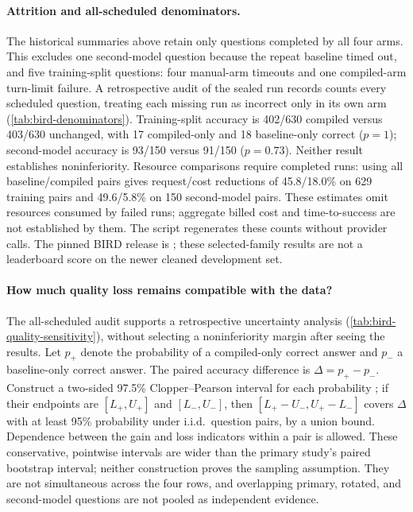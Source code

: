 \paragraph{Attrition and all-scheduled denominators.}
The historical summaries above retain only questions completed by all four
arms. This excludes one second-model question because the repeat baseline
 timed out, and five training-split questions: four manual-arm timeouts and
one compiled-arm turn-limit failure. A retrospective audit of the sealed run
records counts every scheduled question, treating each missing run as incorrect
only in its own arm (\cref{tab:bird-denominators}). Training-split accuracy is
402/630 compiled versus 403/630 unchanged, with 17 compiled-only and 18
baseline-only correct ($p=1$); second-model accuracy is 93/150 versus 91/150
($p=0.73$). Neither result establishes noninferiority. Resource comparisons
require completed runs: using all baseline/compiled pairs gives request/cost
reductions of 45.8/18.0\% on 629 training pairs and 49.6/5.8\% on 150
second-model pairs. These estimates omit resources consumed by failed runs;
aggregate billed cost and time-to-success are not established by them.
The script  regenerates these
counts without provider calls. The pinned BIRD release is
; these selected-family results are not a leaderboard score
on the newer cleaned development set.

\begin{table}[t]
  \centering
  \caption{Retrospective BIRD quality over all scheduled questions. Missing
  runs count as incorrect in their own arm; ``Complete'' is the historical
  four-arm intersection. Rotated repeats the primary questions.}
  \label{tab:bird-denominators}
  \footnotesize
  
\end{table}

\paragraph{How much quality loss remains compatible with the data?}
The all-scheduled audit supports a retrospective uncertainty analysis
(\cref{tab:bird-quality-sensitivity}), without selecting a noninferiority margin
after seeing the results. Let $p_+$ denote the probability of a compiled-only
correct answer and $p_-$ a baseline-only correct answer. The paired accuracy
difference is $\Delta=p_+-p_-$. Construct a two-sided 97.5\% Clopper--Pearson
interval for each probability \citep{clopper1934binomial}; if their endpoints are
$[L_+,U_+]$ and $[L_-,U_-]$, then $[L_+-U_-,U_+-L_-]$ covers $\Delta$ with
at least 95\% probability under i.i.d.\ question pairs, by a union bound.
Dependence between the gain and loss indicators within a pair is allowed.
These conservative, pointwise intervals are wider than the primary study's
paired bootstrap interval; neither construction proves the sampling assumption.
They are not simultaneous across the four rows, and overlapping primary,
rotated, and second-model questions are not pooled as independent evidence.

